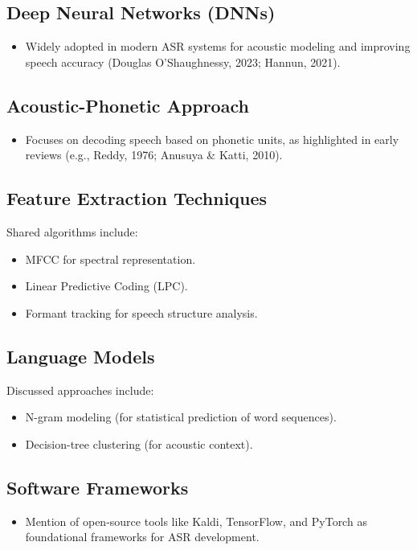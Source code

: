 \subsection{Deep Neural Networks (DNNs)}
\begin{itemize}
    \item Widely adopted in modern ASR systems for acoustic modeling and improving speech accuracy (Douglas O'Shaughnessy, 2023; Hannun, 2021).
\end{itemize}

\subsection{Acoustic-Phonetic Approach}
\begin{itemize}
    \item Focuses on decoding speech based on phonetic units, as highlighted in early reviews (e.g., Reddy, 1976; Anusuya \& Katti, 2010).
\end{itemize}

\subsection{Feature Extraction Techniques}
Shared algorithms include:
\begin{itemize}
    \item MFCC for spectral representation.
    \item Linear Predictive Coding (LPC).
    \item Formant tracking for speech structure analysis.
\end{itemize}

\subsection{Language Models}
Discussed approaches include:
\begin{itemize}
    \item N-gram modeling (for statistical prediction of word sequences).
    \item Decision-tree clustering (for acoustic context).
\end{itemize}

\subsection{Software Frameworks}
\begin{itemize}
    \item Mention of open-source tools like Kaldi, TensorFlow, and PyTorch as foundational frameworks for ASR development.
\end{itemize}